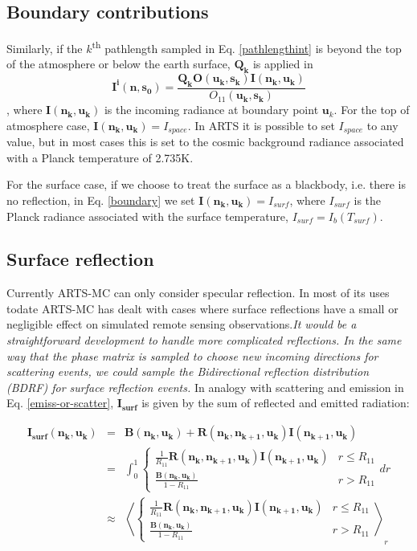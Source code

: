 \subsection {Boundary contributions}

Similarly, if the $k$\textsuperscript{th} pathlength sampled in Eq. \ref{pathlengthint} is beyond the top of the atmosphere or below the earth surface, $\mathbf{Q_k}$ is applied in 
\begin{equation}
\mathbf{I^i(n,s_0)}=\frac{\mathbf{Q_k}\mathbf{O(u_k,s_k)I(n_k,u_k)}}{O_{11}(\mathbf{u_{k},s_k})}
\label{boundary}
\end{equation}
, where 
$\mathbf{I(n_k,u_k)}$ is the incoming radiance at boundary point $\mathbf{u}_{k}$.  For the top of atmosphere case, $\mathbf{I(n_k,u_k)}=I_{space}$.  In ARTS it is possible to set $I_{space}$ to any value, but in most cases this is set to the cosmic background radiance associated with a Planck temperature of 2.735K. 

For the surface case, if we choose to treat the surface as a blackbody, i.e. there is no reflection, in Eq. \ref{boundary} we set $\mathbf{I(n_k,u_k)}=I_{surf}$, where $I_{surf}$ is the Planck radiance associated with the surface temperature, $I_{surf}=I_b\left(T_{surf}\right)$. 

\subsection{Surface reflection} 
\label{sec:surf_refl}
Currently ARTS-MC can only consider specular reflection.  In most of its uses todate ARTS-MC has dealt with cases where surface reflections have a small or negligible effect on simulated remote sensing observations.\emph{It would be a straightforward development to handle more complicated reflections.  In the same way that the phase matrix is sampled to choose new incoming directions for scattering events, we could sample the Bidirectional reflection distribution (BDRF) for surface reflection events.} In analogy with scattering and emission in Eq. \ref{emiss-or-scatter}, $\mathbf{I_{surf}}$ is given by the sum of reflected and emitted radiation:

\begin{eqnarray}
\mathbf{I_{surf}(n_k,u_k)}&=&\mathbf{B(n_k,u_k)}+\mathbf{R(n_k,n_{k+1},u_k)I(n_{k+1},u_k)}\nonumber\\
&=&\int^1_0\left\{\begin{array}{rl}\frac{1}{R_{11}}\mathbf{R(n_k,n_{k+1},u_k)I(n_{k+1},u_k)} & r \le R_{11}\\
\frac{\mathbf{B(n_k,u_k)}}{1-R_{11}}& r > R_{11}\end{array}dr\right.\nonumber\\
&\approx&
\left\langle\left\{\begin{array}{rl}\frac{1}{R_{11}}\mathbf{R(n_k,n_{k+1},u_k)I(n_{k+1},u_k)} & r \le R_{11}\\
\frac{\mathbf{B(n_k,u_k)}}{1-R_{11}}& r > R_{11}\end{array}\right.\right\rangle_r
\label{I_surf}
\end{eqnarray}

